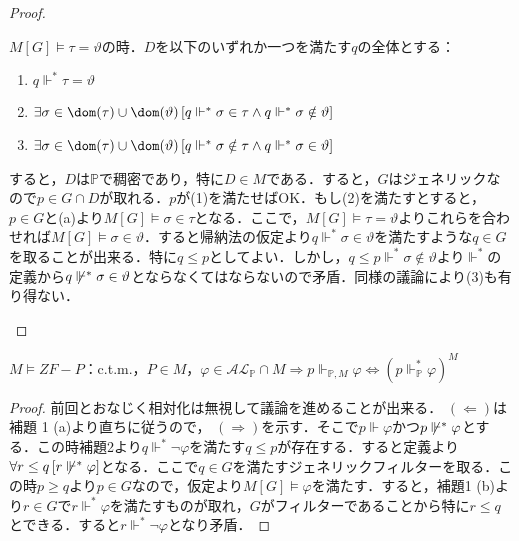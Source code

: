 \documentclass[a4j]{bxjsarticle}
\theoremstyle{definition}
\begin{document}
\begin{proof}
\begin{enumerate}[label=(\alph*)]
	$M[G] \models \tau = \vartheta$の時．$D$を以下のいずれか一つを満たす$q$の全体とする：
	\begin{enumerate}[label=(\arabic*)]
	 \item $q \mathrel{\Vdash^*} \tau = \vartheta$
	       \label{D:forces-equal}
	 \item $\exists \sigma \in \dom(\tau) \cup \dom(\vartheta)\,[q \mathrel{\Vdash^*} \sigma \in \tau \wedge q \mathrel{\Vdash^*} \sigma \notin \vartheta]$
	       \label{D:forces-tau-larger}
	 \item $\exists \sigma \in \dom(\tau) \cup \dom(\vartheta)\,[q \mathrel{\Vdash^*} \sigma \notin \tau \wedge q \mathrel{\Vdash^*} \sigma \in \vartheta]$
	       \label{D:forces-theta-larger}
	\end{enumerate}
	すると，$D$は$\mathbb{P}$で稠密であり，特に$D \in M$である．すると，$G$はジェネリックなので$p \in G \cap D$が取れる．$p$が(1)を満たせばOK．もし(2)を満たすとすると，$p \in G$と(a)より$M[G] \models \sigma \in \tau$となる．ここで，$M[G] \models \tau = \vartheta$よりこれらを合わせれば$M[G] \models \sigma \in \vartheta$．すると帰納法の仮定より$q \mathrel{\Vdash^*} \sigma \in \vartheta$を満たすような$q \in G$を取ることが出来る．特に$q \leq p$としてよい．しかし，$q \leq p \mathrel{\Vdash^*} \sigma \notin \vartheta$より$\mathrel{\Vdash^*}$の定義から$q \not\mathrel{\Vdash^*} \sigma \in \vartheta$とならなくてはならないので矛盾．同様の議論により(3)も有り得ない．\mbox{}
 \end{enumerate}
\end{proof}

\begin{lemma}
 $M \models ZF-P$：c.t.m.，$P \in M$，$\varphi \in \mathcal{AL}_\mathbb{P} \cap M \Longrightarrow p \Vdash_{\mathbb{P}, M} \varphi \Leftrightarrow (p \mathrel{\Vdash_\mathbb{P}^*} \varphi)^M$
\end{lemma}
\begin{proof}
 前回とおなじく相対化は無視して議論を進めることが出来る．
 $(\Leftarrow)$は補題 1 (a)より直ちに従うので，
 $(\Rightarrow)$を示す．そこで$p \Vdash \varphi$かつ$p \not\mathrel{\Vdash^*} \varphi$とする．この時補題2より$q \mathrel{\Vdash^*} \neg \varphi$を満たす$q \leq p$が存在する．すると定義より$\forall r \leq q \, [r \not\mathrel{\Vdash^*} \varphi]$となる．ここで$q \in G$を満たすジェネリックフィルターを取る．この時$p \geq q$より$p \in G$なので，仮定より$M[G] \models \varphi$を満たす．すると，補題1 (b)より$r \in G$で$r \mathrel{\Vdash^*} \varphi$を満たすものが取れ，$G$がフィルターであることから特に$r \leq q$とできる．すると$r \mathrel{\Vdash^*} \neg \varphi$となり矛盾．\mbox{}
\end{proof}
\end{document}
